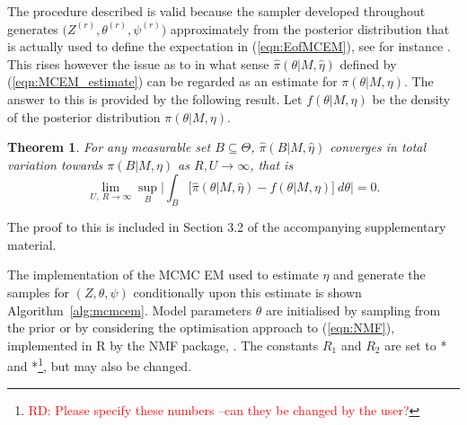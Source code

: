 \documentclass{bioinfo}
\newtheorem{thrm}{Theorem}
\begin{document}
The procedure described is valid because the sampler developed
throughout generates $\big(Z^{(r)}, \theta^{(r)}, \psi^{(r)}\big)$
approximately from the posterior distribution that is actually used to
define the expectation in (\ref{eqn:EofMCEM}), see for instance
\cite{FM}. This rises however the issue as to in what sense
$\widehat\pi(\theta|M, \hat\eta)$ defined by (\ref{eqn:MCEM_estimate})
can be regarded as an estimate for $\pi(\theta|M, \eta)$. The answer
to this is provided by the following result. Let $f(\theta|M, \eta)$
be the density of the posterior distribution $\pi(\theta|M, \eta)$.

\begin{thrm} For any measurable set $B\subseteq \Theta$,
 $\widehat\pi(B|M,\hat\eta)$ converges in total variation
towards $\pi(B|M,\eta)$ as $R, U \to \infty$, that is
\[
   \lim_{U,\ R\to\infty}
   \sup_{B}
    \bigg|
     \int_B
     \Big[
       \widehat \pi(\theta|M, \hat\eta) - f(\theta|M,\eta)
     \Big]\ d\theta
    \bigg|
   = 0.
\]
\end{thrm}

The proof to this is included in Section 3.2 of the accompanying 
supplementary material. 

The implementation of the MCMC EM used to estimate $\eta$ and generate
the samples for $(Z, \theta, \psi)$ conditionally upon this estimate
is shown Algorithm~\ref{alg:mcmcem}. Model parameters $\theta$ are
initialised by sampling from the prior or by considering the
optimisation approach to (\ref{eqn:NMF}), implemented in R by the NMF
package, \cite{GS}. The constants $R_1$ and $R_2$ are set to * and
*\footnote{\textcolor{red}{RD: Please specify these numbers --can they
be changed by the user?}}, but may also be changed.
\end{document}
